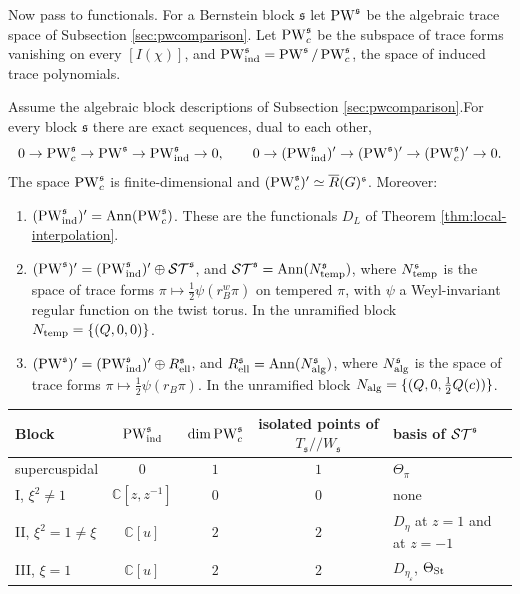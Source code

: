 Now pass to functionals. For a Bernstein block $\mathfrak s$ let $\operatorname{PW}^{\mathfrak s}$ be the algebraic trace space of Subsection \ref{sec:pwcomparison}. Let $\operatorname{PW}^{\mathfrak s}_c$ be the subspace of trace forms vanishing on every $[I(\chi)]$, and $\operatorname{PW}^{\mathfrak s}_{\rm ind}=\operatorname{PW}^{\mathfrak s}/\operatorname{PW}^{\mathfrak s}_c$, the space of induced trace polynomials.

\begin{theorem}\label{thm:exact}
Assume the algebraic block descriptions of Subsection \ref{sec:pwcomparison}.For every block $\mathfrak s$ there are exact sequences, dual to each other,
\[
0\to\operatorname{PW}_c^{\mathfrak s}\to\operatorname{PW}^{\mathfrak s}\to\operatorname{PW}^{\mathfrak s}_{\rm ind}\to0,\qquad
0\to(\operatorname{PW}^{\mathfrak s}_{\rm ind})'\to(\operatorname{PW}^{\mathfrak s})'\to(\operatorname{PW}^{\mathfrak s}_c)'\to0 .
\]
The space $\operatorname{PW}_c^{\mathfrak s}$ is finite-dimensional and $(\operatorname{PW}_c^{\mathfrak s})'\simeq\overline R(G)^{\mathfrak s}$. Moreover:
\begin{enumerate}[label=(\alph*),leftmargin=*]
\item $(\operatorname{PW}^{\mathfrak s}_{\rm ind})'=\operatorname{Ann}(\operatorname{PW}^{\mathfrak s}_c)$. These are the functionals $D_L$ of Theorem \ref{thm:local-interpolation}.
\item $(\operatorname{PW}^{\mathfrak s})'=(\operatorname{PW}^{\mathfrak s}_{\rm ind})'\oplus\mathcal{ST}^{\mathfrak s}$, and $\mathcal{ST}^{\mathfrak s}=\operatorname{Ann}(N^{\mathfrak s}_{\rm temp})$, where $N^{\mathfrak s}_{\rm temp}$ is the space of trace forms $\pi\mapsto\tfrac12\psi(r_B^w\pi)$ on tempered $\pi$, with $\psi$ a Weyl-invariant regular function on the twist torus. In the unramified block $N_{\rm temp}=\{(Q,0,0)\}$.
\item $(\operatorname{PW}^{\mathfrak s})'=(\operatorname{PW}^{\mathfrak s}_{\rm ind})'\oplus R^{\mathfrak s}_{\rm ell}$, and $R_{\rm ell}^{\mathfrak s}=\operatorname{Ann}(N^{\mathfrak s}_{\rm alg})$, where $N^{\mathfrak s}_{\rm alg}$ is the space of trace forms $\pi\mapsto\tfrac12\psi(r_B\pi)$. In the unramified block $N_{\rm alg}=\{(Q,0,\tfrac12Q(c))\}$.
\end{enumerate}
\begin{center}\small
\begin{tabular}{@{}lcccl@{}}\toprule
Block & $\operatorname{PW}_{\rm ind}^{\mathfrak s}$ & $\dim\operatorname{PW}_c^{\mathfrak s}$ & isolated points of $T_{\mathfrak s}/\!/W_{\mathfrak s}$ & basis of $\mathcal{ST}^{\mathfrak s}$\\\midrule
supercuspidal & $0$ & $1$ & $1$ & $\Theta_\pi$\\
I, $\xi^2\ne1$ & $\mathbb C[z,z^{-1}]$ & $0$ & $0$ & none\\
II, $\xi^2=1\ne\xi$ & $\mathbb C[u]$ & $2$ & $2$ & $D_\eta$ at $z=1$ and at $z=-1$\\
III, $\xi=1$ & $\mathbb C[u]$ & $2$ & $2$ & $D_{\eta_\varepsilon}$, $\Theta_{\operatorname{St}}$\\\bottomrule
\end{tabular}
\end{center}
\end{theorem}
